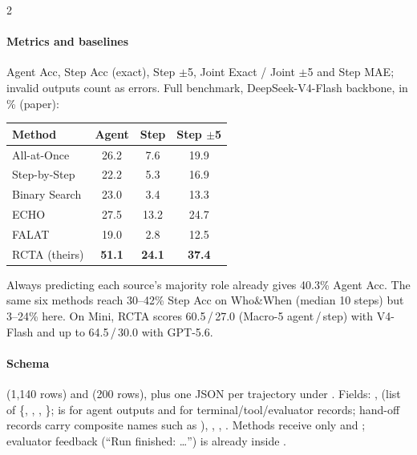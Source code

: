 \begin{multicols}{2}
\paragraph{Metrics and baselines} Agent Acc, Step Acc (exact), Step $\pm$5, Joint Exact / Joint $\pm$5 and Step MAE; invalid outputs count as errors. Full benchmark, DeepSeek-V4-Flash backbone, in \% (paper):

\begin{center}\small
\begin{tabular}{@{}lccc@{}}\toprule
Method & Agent & Step & Step $\pm$5\\\midrule
All-at-Once & 26.2 & 7.6 & 19.9\\
Step-by-Step & 22.2 & 5.3 & 16.9\\
Binary Search & 23.0 & 3.4 & 13.3\\
ECHO & 27.5 & 13.2 & 24.7\\
FALAT & 19.0 & 2.8 & 12.5\\
RCTA (theirs) & \textbf{51.1} & \textbf{24.1} & \textbf{37.4}\\\bottomrule
\end{tabular}
\end{center}
Always predicting each source's majority role already gives 40.3\% Agent Acc. The same six methods reach 30--42\% Step Acc on Who\&When (median 10 steps) but 3--24\% here. On Mini, RCTA scores 60.5\,/\,27.0 (Macro-5 agent\,/\,step) with V4-Flash and up to 64.5\,/\,30.0 with GPT-5.6.

\paragraph{Schema}  (1,140 rows) and  (200 rows), plus one JSON per trajectory under . Fields: ,  (list of \{, , , \};  is  for agent outputs and  for terminal/tool/evaluator records; hand-off records carry composite names such as ), , , . Methods receive only  and ; evaluator feedback (``Run finished: \ldots'') is already inside .
\end{multicols}

